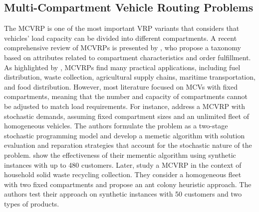 \documentclass[11pt]{elsarticle}
\theoremstyle{plain}
\begin{document}
\subsection{Multi-Compartment Vehicle Routing Problems}
\label{sec:MCVRP}

The \ac{MCVRP} is one of the most important \ac{VRP} variants that considers that vehicles' load capacity can be divided into different compartments. A recent comprehensive review of \acp{MCVRP} is presented by \cite{ostermeier2021multi}, who propose a taxonomy based on attributes related to compartment characteristics and order fulfillment. 
As highlighted by \cite{ostermeier2021multi}, \acp{MCVRP} find many practical applications, including fuel distribution, waste collection, agricultural supply chains, maritime transportation, and food distribution. However, most literature focused on \acp{MCV} with fixed compartments, meaning that the number and capacity of compartments cannot be adjusted to match load requirements.
For instance, \cite{mendoza2010memetic} address a \ac{MCVRP} with stochastic demands, assuming fixed compartment sizes and an unlimited fleet of homogeneous vehicles. The authors formulate the problem as a two-stage stochastic programming model and develop a memetic algorithm with solution evaluation and reparation strategies that account for the stochastic nature of the problem. \cite{mendoza2010memetic} show the effectiveness of their mementic algorithm using synthetic instances with up to 480 customers. 
Later, \cite{reed2014ant} study a \ac{MCVRP} in the context of household solid waste recycling collection. They consider a homogeneous fleet with two fixed compartments and propose an ant colony heuristic approach. The authors test their approach on synthetic instances with 50 customers and two types of products. 
\end{document}
